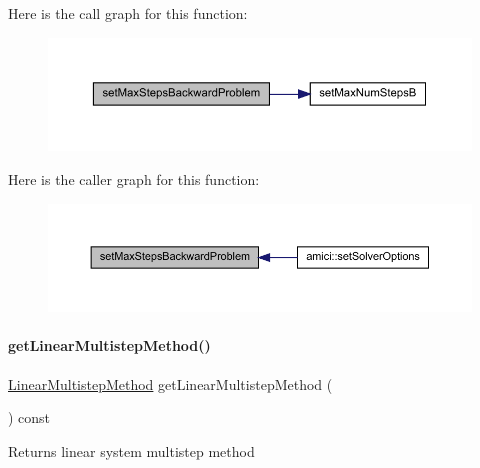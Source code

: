 Here is the call graph for this function\+:
\nopagebreak
\begin{figure}[H]
\begin{center}
\leavevmode
\includegraphics[width=350pt]{classamici_1_1_solver_aa1d39cd744f489c17c3497c98acb7f59_cgraph}
\end{center}
\end{figure}
Here is the caller graph for this function\+:
\nopagebreak
\begin{figure}[H]
\begin{center}
\leavevmode
\includegraphics[width=350pt]{classamici_1_1_solver_aa1d39cd744f489c17c3497c98acb7f59_icgraph}
\end{center}
\end{figure}
\mbox{\label{classamici_1_1_solver_a60631d9a18e29c1102cae7cb77b9918c}} 
\paragraph{\texorpdfstring{get\+Linear\+Multistep\+Method()}{getLinearMultistepMethod()}}
{\footnotesize\ttfamily \mbox{\hyperlink{namespaceamici_a9ebe272482a8e073efe7078b7e96e8bc}{Linear\+Multistep\+Method}} get\+Linear\+Multistep\+Method (\begin{DoxyParamCaption}{ }\end{DoxyParamCaption}) const}

\begin{DoxyReturn}{Returns}
linear system multistep method 
\end{DoxyReturn}


